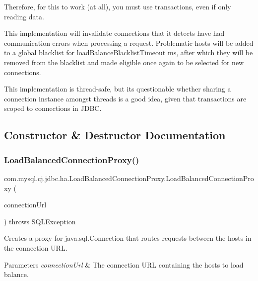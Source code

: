 Therefore, for this to work (at all), you must use transactions, even if only reading data.

This implementation will invalidate connections that it detects have had communication errors when processing a request. Problematic hosts will be added to a global blacklist for load\+Balance\+Blacklist\+Timeout ms, after which they will be removed from the blacklist and made eligible once again to be selected for new connections.

This implementation is thread-\/safe, but it\textquotesingle{}s questionable whether sharing a connection instance amongst threads is a good idea, given that transactions are scoped to connections in J\+D\+BC. 

\subsection{Constructor \& Destructor Documentation}
\mbox{\label{classcom_1_1mysql_1_1cj_1_1jdbc_1_1ha_1_1_load_balanced_connection_proxy_a236928d6a49c1bbc3dfd6e4615a34f0d}} 
\subsubsection{\texorpdfstring{Load\+Balanced\+Connection\+Proxy()}{LoadBalancedConnectionProxy()}}
{\footnotesize\ttfamily com.\+mysql.\+cj.\+jdbc.\+ha.\+Load\+Balanced\+Connection\+Proxy.\+Load\+Balanced\+Connection\+Proxy (\begin{DoxyParamCaption}\item[{\mbox{\hyperlink{classcom_1_1mysql_1_1cj_1_1conf_1_1url_1_1_loadbalance_connection_url}{Loadbalance\+Connection\+Url}}}]{connection\+Url }\end{DoxyParamCaption}) throws S\+Q\+L\+Exception}

Creates a proxy for java.\+sql.\+Connection that routes requests between the hosts in the connection U\+RL.


\begin{DoxyParams}{Parameters}
{\em connection\+Url} & The connection U\+RL containing the hosts to load balance. \\
\hline
\end{DoxyParams}

